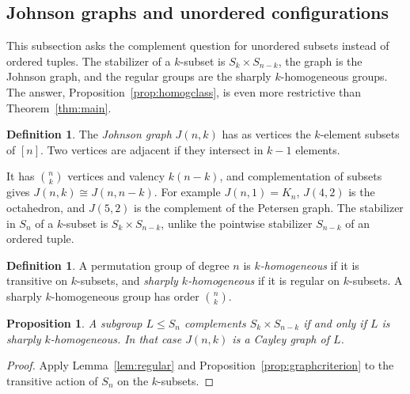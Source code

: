 \documentclass[12pt,letterpaper]{article}
\numberwithin{equation}{section}
\newtheorem{proposition}[theorem]{Proposition}
\theoremstyle{definition}
\newtheorem{definition}[theorem]{Definition}
\begin{document}
\subsection{Johnson graphs and unordered configurations}\label{subsec:johnson}
This subsection asks the complement question for unordered subsets instead of ordered tuples. The stabilizer of a $k$-subset is $S_k\times S_{n-k}$, the graph is the Johnson graph, and the regular groups are the sharply $k$-homogeneous groups. The answer, Proposition~\ref{prop:homogclass}, is even more restrictive than Theorem~\ref{thm:main}.
\begin{definition}
The \emph{Johnson graph} $J(n,k)$ has as vertices the $k$-element subsets of $[n]$. Two vertices are adjacent if they intersect in $k-1$ elements.
\end{definition}
It has $\binom nk$ vertices and valency $k(n-k)$, and complementation of subsets gives $J(n,k)\cong J(n,n-k)$. For example $J(n,1)=K_n$, $J(4,2)$ is the octahedron, and $J(5,2)$ is the complement of the Petersen graph. The stabilizer in $S_n$ of a $k$-subset is $S_k\times S_{n-k}$, unlike the pointwise stabilizer $S_{n-k}$ of an ordered tuple.
\begin{definition}
A permutation group of degree $n$ is \emph{$k$-homogeneous} if it is transitive on $k$-subsets, and \emph{sharply $k$-homogeneous} if it is regular on $k$-subsets. A sharply $k$-homogeneous group has order $\binom nk$.
\end{definition}
\begin{proposition}\label{prop:johnson}
A subgroup $L\leq S_n$ complements $S_k\times S_{n-k}$ if and only if $L$ is sharply $k$-homogeneous. In that case $J(n,k)$ is a Cayley graph of $L$.
\end{proposition}
\begin{proof}
Apply Lemma~\ref{lem:regular} and Proposition~\ref{prop:graphcriterion} to the transitive action of $S_n$ on the $k$-subsets.
\end{proof}
\end{document}
